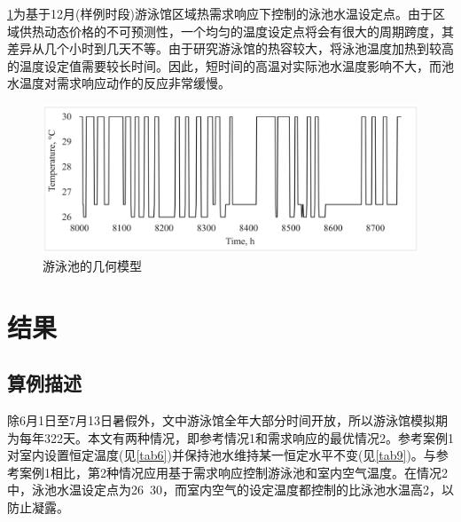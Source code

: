 \documentclass[hyperref]{ctexart}
\begin{document}
\begin{multicols}{2}
		\cref{fig9}为基于12月(样例时段)游泳馆区域热需求响应下控制的泳池水温设定点。由于区域供热动态价格的不可预测性，一个均匀的温度设定点将会有很大的周期跨度，其差异从几个小时到几天不等。由于研究游泳馆的热容较大，将泳池温度加热到较高的温度设定值需要较长时间。因此，短时间的高温对实际池水温度影响不大，而池水温度对需求响应动作的反应非常缓慢。
		\par
		\begin{figure}[htbp]
			\centering
			\includegraphics[scale=0.4]{figure_translate/9.png}
			\caption{游泳池的几何模型}
			\label{fig9}
		\end{figure}
		\section{结果}
		\subsection{算例描述}
		除6月1日至7月13日暑假外，文中游泳馆全年大部分时间开放，所以游泳馆模拟期为每年322天。本文有两种情况，即参考情况1和需求响应的最优情况2。参考案例1对室内设置恒定温度(见\cref{tab6})并保持池水维持某一恒定水平不变(见\cref{tab9})。与参考案例1相比，第2种情况应用基于需求响应控制游泳池和室内空气温度。在情况2中，泳池水温设定点为26\textcelsius~30\textcelsius，而室内空气的设定温度都控制的比泳池水温高2\textcelsius，以防止凝露。
		\par

\end{multicols}
\end{document}
